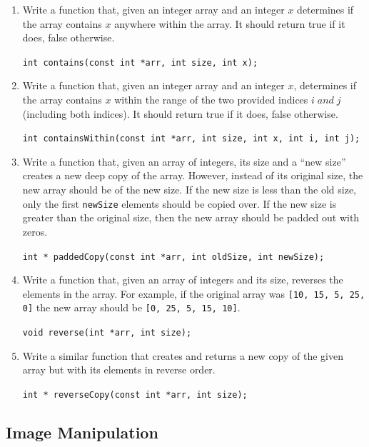 \documentclass[12pt]{scrartcl}
\begin{document}
\begin{enumerate}

  \item Write a function that, given an integer array and an integer 
  $x$ determines if the array contains $x$ anywhere within the array.
  It should return true if it does, false otherwise.
  
  \texttt{int contains(const int *arr, int size, int x);}

  \item Write a function that, given an integer array and an integer 
  $x$, determines if the array contains $x$ within the range of the two provided indices $ i\;and\; j $ (including both indices).
  It should return true if it does, false otherwise.

  
  \texttt{int containsWithin(const int *arr, int size, int x, int i, int j);}
  
  \item Write a function that, given an array of integers, its size and a
  ``new size'' creates a new deep copy of the array.  However, instead of
  its original size, the new array should be of the new size.  If the new
  size is less than the old size, only the first \texttt{newSize} 
  elements should be copied over.  If the new size is greater than the original
  size, then the new array should be padded out with zeros.
  
  \texttt{int * paddedCopy(const int *arr, int oldSize, int newSize);}

  \item Write a function that, given an array of integers and its size, 
  reverses the elements in the array.  For example, if the original array
  was \texttt{[10, 15, 5, 25, 0]} the new array should be 
  \texttt{[0, 25, 5, 15, 10]}.
  
  \texttt{void reverse(int *arr, int size);}

  \item Write a similar function that creates and returns a new copy of 
  the given array but with its elements in reverse order. 
  
  \texttt{int * reverseCopy(const int *arr, int size);}

\end{enumerate}

\subsection*{Image Manipulation}
\end{document}
